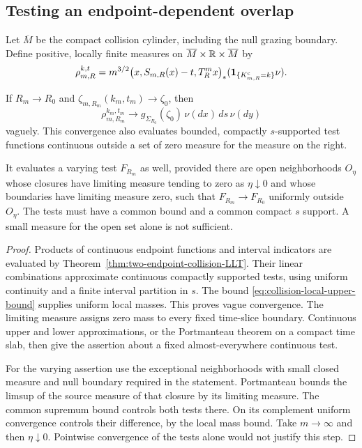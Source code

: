 \subsection{Testing an endpoint-dependent overlap}
Let $\overline M$ be the compact collision cylinder, including the
null grazing boundary. Define positive, locally finite measures on
$\overline M\times\mathbb R\times\overline M$ by
\begin{equation}\label{eq:collision-local-source-measure}
 \rho_{m,R}^{k,t}
 =m^{3/2}\bigl(x,S_{m,R}(x)-t,T_R^m x\bigr)_*
                     (\one_{\{K^{\rm c}_{m,R}=k\}}\nu).
\end{equation}
\begin{corollary}
\label{cor:local-endpoint-measures}
If $R_m\to R_0$ and $\zeta_{m,R_m}(k_m,t_m)\to\zeta_0$, then
\begin{equation}\label{eq:collision-local-source-limit}
 \rho_{m,R_m}^{k_m,t_m}\longrightarrow
       g_{\Sigma_{R_0}}(\zeta_0)\,\nu(dx)\,ds\,\nu(dy)
\end{equation}
vaguely. This convergence also evaluates bounded, compactly
$s$-supported test functions continuous outside a set of zero measure
for the measure on the right.

It evaluates a varying test $F_{R_m}$ as well, provided there are open
neighborhoods $O_\eta$ whose closures have limiting measure tending
to zero as $\eta\downarrow0$ and whose boundaries have limiting
measure zero, such that $F_{R_m}\to F_{R_0}$ uniformly outside
$O_\eta$. The tests must have a common bound and a common compact
$s$ support. A small measure for the open set alone is not sufficient.
\end{corollary}
\begin{proof}
Products of continuous endpoint functions and interval indicators are
evaluated by Theorem~\ref{thm:two-endpoint-collision-LLT}. Their linear
combinations approximate continuous compactly supported tests, using
uniform continuity and a finite interval partition in $s$. The bound
\eqref{eq:collision-local-upper-bound} supplies uniform local masses.
This proves vague convergence. The limiting measure assigns zero mass
to every fixed time-slice boundary. Continuous upper and lower
approximations, or the Portmanteau theorem on a compact time slab,
then give the assertion about a fixed almost-everywhere continuous
test.

For the varying assertion use the exceptional neighborhoods with
small closed measure and null boundary required in the statement.
Portmanteau bounds the
limsup of the source measure of that closure by its limiting measure.
The common supremum bound controls both tests there. On its complement
uniform convergence controls their difference, by the local mass bound.
Take $m\to\infty$ and then $\eta\downarrow0$. Pointwise convergence
of the tests alone would not justify this step.
\end{proof}
